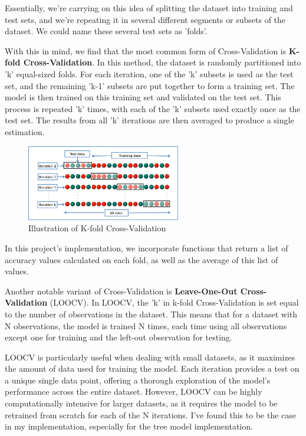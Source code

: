 \documentclass[letterpaper,10pt]{article}
\begin{document}
Essentially, we're carrying on this idea of splitting the dataset into training and test sets, and we're repeating it in several different segments or subsets of the dataset. We could name these several test sets as 'folds'. \par

With this in mind, we find that the most common form of Cross-Validation is \textbf{K-fold Cross-Validation}. In this method, the dataset is randomly partitioned into 'k' equal-sized folds. For each iteration, one of the 'k' subsets is used as the test set, and the remaining 'k-1' subsets are put together to form a training set. The model is then trained on this training set and validated on the test set. This process is repeated 'k' times, with each of the 'k' subsets used exactly once as the test set. The results from all 'k' iterations are then averaged to produce a single estimation. \par

\begin{figure}[ht]
    \centering
    \includegraphics[width=0.6\textwidth]{KFolds.png}
    \caption{Illustration of K-fold Cross-Validation}
    \label{fig:kfolds}
\end{figure}

In this project's implementation, we incorporate functions that return a list of accuracy values calculated on each fold, as well as the average of this list of values. \par

Another notable variant of Cross-Validation is \textbf{Leave-One-Out Cross-Validation} (LOOCV). In LOOCV, the 'k' in k-fold Cross-Validation is set equal to the number of observations in the dataset. This means that for a dataset with N observations, the model is trained N times, each time using all observations except one for training and the left-out observation for testing. \par

LOOCV is particularly useful when dealing with small datasets, as it maximizes the amount of data used for training the model. Each iteration provides a test on a unique single data point, offering a thorough exploration of the model's performance across the entire dataset. However, LOOCV can be highly computationally intensive for larger datasets, as it requires the model to be retrained from scratch for each of the N iterations. I've found this to be the case in my implementation, especially for the tree model implementation.
\end{document}
